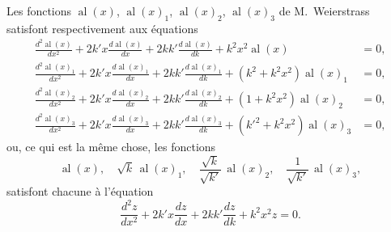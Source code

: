 \documentclass[11pt,a4paper]{article}
\providecommand{\al}{\mathop{\mathrm{al}}\nolimits}
\begin{document}
Les fonctions $\al(x)$, $\al(x)_1$, $\al(x)_2$, $\al(x)_3$ de M.~Weierstrass satisfont respectivement aux \'{e}quations
\begin{align*}
\frac{d^2\al(x)}{dx^2}+2k'x\frac{d\al(x)}{dx}+2kk'\frac{d\al(x)}{dk}+k^2x^2\al(x)&=0,\\
\frac{d^2\al(x)_1}{dx^2}+2k'x\frac{d\al(x)_1}{dx}+2kk'\frac{d\al(x)_1}{dk}+(k^2+k^2x^2)\al(x)_1&=0,\\
\frac{d^2\al(x)_2}{dx^2}+2k'x\frac{d\al(x)_2}{dx}+2kk'\frac{d\al(x)_2}{dk}+(1+k^2x^2)\al(x)_2&=0,\\
\frac{d^2\al(x)_3}{dx^2}+2k'x\frac{d\al(x)_3}{dx}+2kk'\frac{d\al(x)_3}{dk}+(k'^2+k^2x^2)\al(x)_3&=0,
\end{align*}
ou, ce qui est la m\^{e}me chose, les fonctions
\[
\al(x),\quad \sqrt{k}\,\al(x)_1,\quad \frac{\sqrt{k}}{\sqrt{k'}}\,\al(x)_2,\quad \frac{1}{\sqrt{k'}}\,\al(x)_3,
\]
satisfont chacune \`{a} l'\'{e}quation
\[
\frac{d^2z}{dx^2}+2k'x\frac{dz}{dx}+2kk'\frac{dz}{dk}+k^2x^2 z=0.
\]
\end{document}
